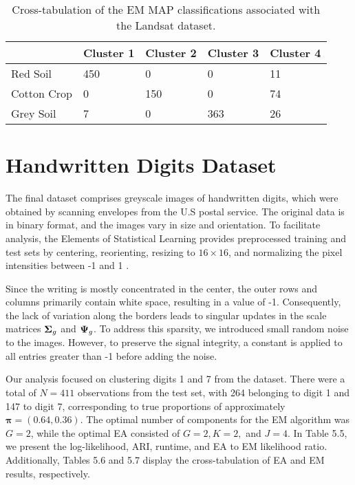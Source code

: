 \documentclass[12pt]{report}
\begin{document}
\begin{table}[!htbp]
  \caption{Cross-tabulation of the EM MAP classifications associated with the Landsat dataset.}
    \vspace{0.5cm}
  \begin{tabularx}{\textwidth}{l *{4}{X}}
  \toprule
   &\textbf{Cluster 1}  & \textbf{Cluster 2}  & \textbf{Cluster 3}  & \textbf{Cluster 4}   \\
  \midrule
  Red Soil & 	450 & 0 & 0 & 11\\
  Cotton Crop &0 & 150 &  0 & 74 \\
   Grey Soil &   7 & 0 &  363  & 26\\
  \bottomrule
  \end{tabularx}
\end{table}
\newpage


\section{Handwritten Digits Dataset}
The final dataset comprises greyscale images of handwritten digits, which were obtained by scanning envelopes from the U.S postal service. The original data is in binary format, and the images vary in size and orientation. To facilitate analysis, the Elements of Statistical Learning provides preprocessed training and test sets by centering, reorienting, resizing to $16 \times 16$, and normalizing the pixel intensities between -1 and 1 \citep{hastie2009}. 

Since the writing is mostly concentrated in the center, the outer rows and columns primarily contain white space, resulting in a value of -1. Consequently, the lack of variation along the borders leads to singular updates in the scale matrices ${\bf \Sigma}_g$ and ${\bf \Psi}_g$. To address this sparsity, we introduced small random noise to the images. However, to preserve the signal integrity, a constant is applied to all entries greater than -1 before adding the noise.

Our analysis focused on clustering digits 1 and 7 from the dataset. There were a total of $N=411$ observations from the test set, with 264 belonging to digit 1 and 147 to digit 7, corresponding to true proportions of approximately $\bm{\pi} = (0.64, 0.36)$. The optimal number of components for the EM algorithm was $G=2$, while the optimal EA consisted of $G=2, K=2,$ and $J=4$. In Table 5.5, we present the log-likelihood, ARI, runtime, and EA to EM likelihood ratio. Additionally, Tables 5.6 and 5.7 display the cross-tabulation of EA and EM results, respectively.
\end{document}
